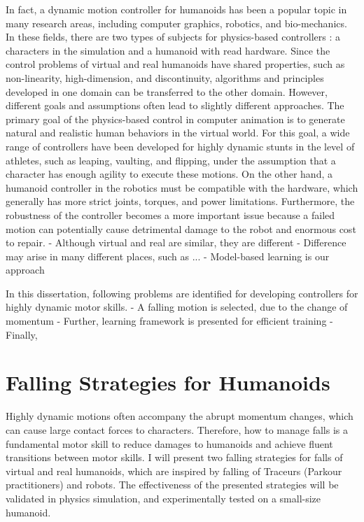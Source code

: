 In fact, a dynamic motion controller for humanoids has been
a popular topic in many research areas, including computer graphics,
robotics, and bio-mechanics.
In these fields, there are two types of subjects for physics-based controllers
: a characters in the simulation and a humanoid with read hardware.
Since the control problems of virtual and real humanoids have shared 
properties, such as non-linearity, high-dimension, and discontinuity, 
algorithms and principles developed in one domain can be transferred to 
the other domain.
However, different goals and assumptions often lead to
slightly different approaches.
The primary goal of the physics-based control in computer animation is to
generate natural and realistic human behaviors in the virtual world.
For this goal, a wide range of controllers have been developed for highly
dynamic stunts in the level of athletes, such as leaping, vaulting, and
flipping, under the assumption that a character has enough agility to execute
these motions.
On the other hand, a humanoid controller in the robotics must be compatible 
with the hardware, which generally has more strict joints, torques, and power
limitations.
Furthermore, the robustness of the controller becomes a more important issue
because a failed motion can potentially cause detrimental damage to the robot
and enormous cost to repair.
- Although virtual and real are similar, they are different
- Difference may arise in many different places, such as ...
- Model-based learning is our approach

In this dissertation, following problems are identified for developing 
controllers for highly dynamic motor skills.
- A falling motion is selected, due to the change of momentum
- Further, learning framework is presented for efficient training
- Finally, 

\section{Falling Strategies for Humanoids}
Highly dynamic motions often accompany the abrupt momentum changes, which can
cause large contact forces to characters.
Therefore, how to manage falls is a fundamental motor skill to reduce damages
to humanoids and achieve fluent transitions between motor skills.
I will present two falling strategies for falls of virtual and real humanoids,
which are inspired by falling of Traceurs (Parkour practitioners) and robots.
The effectiveness of the presented strategies will be validated in physics
simulation, and experimentally tested on a small-size humanoid.

